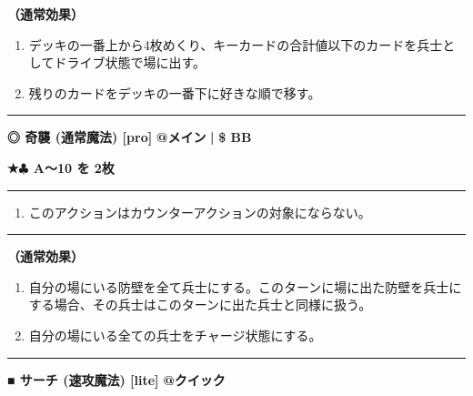 \documentclass[twocolumn,a5paper,papersize,10pt]{jarticle}
\begin{document}
{\bf（通常効果）}


\vspace{-1zh}%
\begin{enumerate}
\setlength{\leftskip}{-0.3cm}
\setlength{\parskip}{0pt} %

\item デッキの一番上から4枚めくり、キーカードの合計値以下のカードを兵士としてドライブ状態で場に出す。

\item 残りのカードをデッキの一番下に好きな順で移す。
\vspace{-1zh}%
\end{enumerate}
\vspace{2mm} %
\hrule height 0.5mm depth 0mm width 66.5mm %
\vspace{1mm} %
{\small\bf ◎ 奇襲 {\scriptsize (通常魔法) [pro]}} %
\hfill 
{\footnotesize\bf @メイン }
  {\footnotesize\bf | } {\footnotesize\bf \$ BB}

{\footnotesize\bf ★{\normalsize $\clubsuit$} A〜10 を 2枚}

\vspace{1mm}%
\hrule height 0.1mm depth 0mm width 66.5mm %
\vspace{1mm}%


\vspace{-1zh}%
\begin{enumerate}
\renewcommand{\labelenumi}{※}
\setlength{\leftskip}{-0.3cm}
\setlength{\itemsep}{0pt} %
\setlength{\parskip}{0pt} %

\item このアクションはカウンターアクションの対象にならない。

\vspace{-3mm}%
\end{enumerate}
\vspace{1mm}%
\hrule height 0.1mm depth 0mm width 66.5mm %
\vspace{1mm}%

{\bf（通常効果）}


\vspace{-1zh}%
\begin{enumerate}
\setlength{\leftskip}{-0.3cm}
\setlength{\parskip}{0pt} %

\item 自分の場にいる防壁を全て兵士にする。このターンに場に出た防壁を兵士にする場合、その兵士はこのターンに出た兵士と同様に扱う。

\item 自分の場にいる全ての兵士をチャージ状態にする。
\vspace{-1zh}%
\end{enumerate}
\vspace{2mm} %
\hrule height 0.5mm depth 0mm width 66.5mm %
\vspace{1mm} %
{\small\bf ■ サーチ {\scriptsize (速攻魔法) [lite]}} %
\hfill 
{\footnotesize\bf @クイック }
\end{document}

